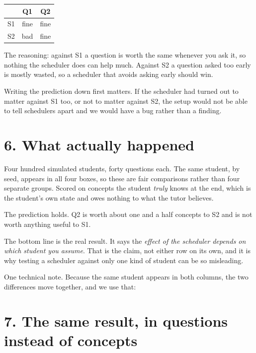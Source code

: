 \documentclass[11pt]{article}
\begin{document}
\begin{center}
\small
\begin{tabular}{@{}lcc@{}}
\toprule
 & \textbf{Q1} & \textbf{Q2}\\
\midrule
S1 & fine & fine\\
S2 & bad & fine\\
\bottomrule
\end{tabular}
\end{center}

\noindent The reasoning: against S1 a question is worth the same whenever
you ask it, so nothing the scheduler does can help much. Against S2 a
question asked too early is mostly wasted, so a scheduler that avoids
asking early should win.

Writing the prediction down first matters. If the scheduler had turned out
to matter against S1 too, or not to matter against S2, the setup would not
be able to tell schedulers apart and we would have a bug rather than a
finding.

\section*{6. What actually happened}

Four hundred simulated students, forty questions each. The same student,
by seed, appears in all four boxes, so these are fair comparisons rather
than four separate groups. Scored on concepts the student \emph{truly}
knows at the end, which is the student's own state and owes nothing to
what the tutor believes.



\noindent The prediction holds. Q2 is worth about one and a half concepts
to S2 and is not worth anything useful to S1.

The bottom line is the real result. It says the \emph{effect of the
scheduler depends on which student you assume}. That is the claim, not
either row on its own, and it is why testing a scheduler against only one
kind of student can be so misleading.

One technical note. Because the same student appears in both columns, the
two differences move together, and we use that: 

\section*{7. The same result, in questions instead of concepts}
\end{document}
